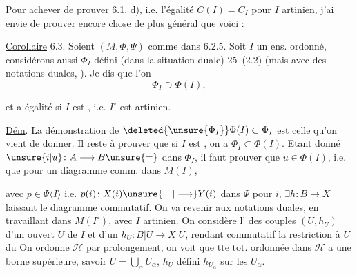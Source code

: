 Pour achever de prouver 6.1. d),
i.e. l'égalité $C(I)=C_I$ pour $I$
artinien, j'ai envie de prouver encore
 chose de plus général que voici :

\uline{Corollaire} 6.3. Soient $(M,\Phi,\Psi)$  comme
dans 6.2.5. Soit $I$ un ens. ordonné,
  considérons aussi $\Phi_I$ défini (dans la
 situation duale)  25--(2.2) (mais
avec des notations duales, ). Je dis que l'on
\[
 \Phi_I\supset\Phi(I),\tag*{(6.3.1)}
\]

et  a égalité si $I$ est , i.e. $I^\circ$ est
artinien.

\uline{Dém}. La démonstration de $\deleted{\unsure{\Phi_I}}\Phi(I)\subset\Phi_I$
est celle qu'on vient de donner. Il reste
à prouver que si $I$ est , on a
$\Phi_I\subset\Phi(I)$. Etant donné $\unsure{i|u}\colon A\longrightarrow B\unsure{=}$
dans $\Phi_I$, il faut prouver que $u\in\Phi(I)$, i.e.
que pour un diagramme comm. dans $M(I)$,


avec $p\in\Psi\langle I\rangle$ i.e. $p(i)\colon X(i)\unsure{\text{---}|\longrightarrow}Y(i)$
dans $\Psi$ pour  $i$, $\exists h\colon B\longrightarrow X$ laissant le
diagramme commutatif. On va revenir
aux notations duales, en travaillant dans
$M(I^\circ)$, avec $I$ artinien. On considère
l'  des couples $(U,h_U)$ d'un ouvert $U$
de $I$ et d'un $h_U\colon B|U\longrightarrow X|U$,
rendant commutatif la restriction à $U$
du  On ordonne $\mathcal H$ par prolongement,
on voit que tte  tot. ordonnée  dans
$\mathcal H$ a une borne supérieure, savoir
$U=\bigcup_\alpha U_\alpha$, $h_U$ défini  $h_{U_\alpha}$ sur les $U_\alpha$.


